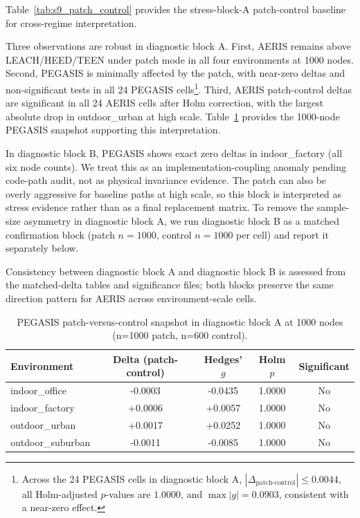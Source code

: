 ﻿\documentclass[sensors,article,submit,moreauthors,pdftex]{Definitions/mdpi}
\begin{document}
Table~\ref{tab:s9_patch_control} provides the stress-block-A patch-control baseline for cross-regime interpretation.

Three observations are robust in diagnostic block A. First, AERIS remains above LEACH/HEED/TEEN under patch mode in all four environments at 1000 nodes. Second, PEGASIS is minimally affected by the patch, with near-zero deltas and non-significant tests in all 24 PEGASIS cells\footnote{Across the 24 PEGASIS cells in diagnostic block A, \(|\Delta_{\text{patch-control}}| \le 0.0044\), all Holm-adjusted \(p\)-values are \(1.0000\), and \(\max |g| = 0.0903\), consistent with a near-zero effect.}. Third, AERIS patch-control deltas are significant in all 24 AERIS cells after Holm correction, with the largest absolute drop in outdoor\_urban at high scale. Table~\ref{tab:s9_pegasis_1000} provides the 1000-node PEGASIS snapshot supporting this interpretation.

In diagnostic block B, PEGASIS shows exact zero deltas in indoor\_factory (all six node counts). We treat this as an implementation-coupling anomaly pending code-path audit, not as physical invariance evidence. The patch can also be overly aggressive for baseline paths at high scale, so this block is interpreted as stress evidence rather than as a final replacement matrix. To remove the sample-size asymmetry in diagnostic block A, we run diagnostic block B as a matched confirmation block (patch \(n=1000\), control \(n=1000\) per cell) and report it separately below.

Consistency between diagnostic block A and diagnostic block B is assessed from the matched-delta tables and significance files; both blocks preserve the same direction pattern for AERIS across environment-scale cells.

\begin{table}[H]
\caption{PEGASIS patch-versus-control snapshot in diagnostic block A at 1000 nodes (n=1000 patch, n=600 control).}
\label{tab:s9_pegasis_1000}
\centering
\begin{tabular}{lcccc}
\toprule
Environment & Delta (patch-control) & Hedges' $g$ & Holm $p$ & Significant \\
\midrule
indoor\_office    & -0.0003 & -0.0435 & 1.0000 & No \\
indoor\_factory   & +0.0006 & +0.0057 & 1.0000 & No \\
outdoor\_urban    & +0.0017 & +0.0252 & 1.0000 & No \\
outdoor\_suburban & -0.0011 & -0.0085 & 1.0000 & No \\
\bottomrule
\end{tabular}
\end{table}
\end{document}
